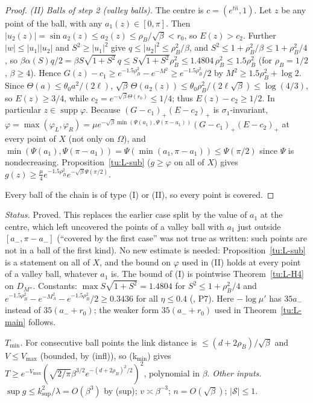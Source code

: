 \begin{proof}
\emph{(II) Balls of step 2 (valley balls).} The centre is $c=(e^{t\hat n},1)$. Let $z$ be any point of the ball, with any $a_1(z)\in[0,\pi]$.
Then $|u_2(z)|=\sin a_2(z)\le a_2(z)\le\rho_B/\sqrt\beta<r_0$, so $E(z)>c_2$. Further $|w|\le|u_1||u_2|$ and $S^2\ge|u_1|^2$ give
$q\le|u_2|^2\le\rho_B^2/\beta$, and $S^2\le1+\rho_B^2/\beta\le1+\rho_B^2/4$, so
$\beta\alpha(S)q/2=\beta S\sqrt{1+S^2}\,q\le S\sqrt{1+S^2}\rho_B^2\le1.4804\,\rho_B^2\le1.5\rho_B^2$ (for $\rho_B=1/2$, $\beta\ge4$).
Hence $G(z)-c_1\ge e^{-1.5\rho_B^2}-e^{-M^2}\ge e^{-1.5\rho_B^2}/2$ by $M^2\ge1.5\rho_B^2+\log2$. Since
$\Theta(a)\le\theta_0a^2/(2\ell)$, $\sqrt\beta\,\Theta(a_2(z))\le\theta_0\rho_B^2/(2\ell\sqrt\beta)\le\log(4/3)$, so $E(z)\ge3/4$, while
$c_2=e^{-\sqrt\beta\Theta(r_0)}\le1/4$; thus $E(z)-c_2\ge1/2$. In particular $z\in\operatorname{supp}\varphi$. Because
$(G-c_1)_+(E-c_2)_+$ is $\sigma_1$-invariant, $\varphi=\max(\varphi_L,\varphi_R)=\mu e^{-\sqrt\beta\min(\Psi(a_1),\Psi(\pi-a_1))}(G-c_1)_+(E-c_2)_+$
at every point of $X$ (not only on $\Omega$), and $\min(\Psi(a_1),\Psi(\pi-a_1))=\Psi(\min(a_1,\pi-a_1))\le\Psi(\pi/2)$ since $\Psi$ is
nondecreasing. Proposition~\ref{tu:L-sub} ($g\ge\varphi$ on all of $X$) gives
$g(z)\ge\frac\mu4e^{-1.5\rho_B^2}e^{-\sqrt\beta\Psi(\pi/2)}$.

Every ball of the chain is of type (I) or (II), so every point is covered.
\end{proof}

\noindent\emph{Status.} Proved. This replaces the earlier case split by the value of $a_1$ at the centre, which left uncovered
the points of a valley ball with $a_1$ just outside $[a_-,\pi-a_-]$ (``covered by the first case'' was not true as written: such
points are not in a ball of the first kind). No new estimate is needed: Proposition~\ref{tu:L-sub} is a statement on all of $X$,
and the bound on $\varphi$ used in (II) holds at every point of a valley ball, whatever $a_1$ is. The bound of (I) is pointwise
Theorem~\ref{tu:L-H4} on $D_{M''}$. Constants: $\max S\sqrt{1+S^2}=1.4804$ for $S^2\le1+\rho_B^2/4$ and
$e^{-1.5\rho_B^2}-e^{-M_A^2}-e^{-1.5\rho_B^2}/2\ge0.3436$ for all $\eta\le0.4$ (, P7). Here $-\log\mu'$ has
$35a_-$ instead of $35(a_-+r_0)$; the weaker form $35(a_-+r_0)$ used in Theorem~\ref{tu:L-main} follows.

\noindent\emph{$T_{\min}$.} For consecutive ball points the link distance is $\le(d+2\rho_B)/\sqrt\beta$ and $V\le V_{\max}$ (bounded,
by (infl)), so (k$_{\min}$) gives $T\ge e^{-V_{\max}}(\sqrt{2/\pi}\beta^{3/2}e^{-(d+2\rho_B)^2/2})^2$, polynomial in $\beta$.
\emph{Other inputs.} $\sup g\le k_{\sup}^2/\lambda=O(\beta^3)$ by (sup); $v\asymp\beta^{-3}$; $n=O(\sqrt\beta)$; $|\mathcal S|\le1$.

